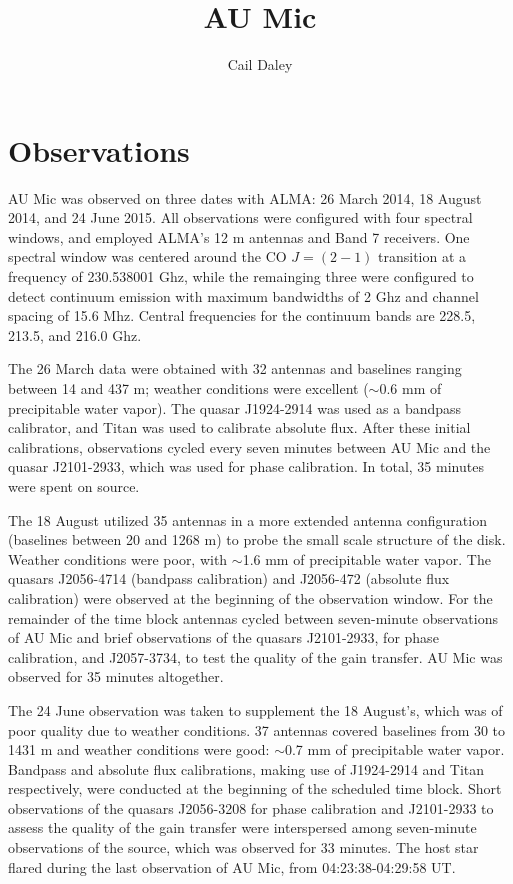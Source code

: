 \documentclass[11pt,modern]{aastex6}
\begin{document}
\title{AU Mic}

\author{Cail Daley}


\section{Observations}
AU Mic was observed on three dates with ALMA: 26 March 2014, 18 August 2014, and 24 June 2015. All observations were configured with four spectral windows, and employed ALMA's 12 m antennas and Band 7 receivers. One spectral window was centered around the CO $J = (2-1)$ transition at a frequency of 230.538001 Ghz, while the remainging three were configured to detect continuum emission with maximum bandwidths of 2 Ghz and channel spacing of 15.6 Mhz. Central frequencies for the continuum bands are 228.5, 213.5, and 216.0 Ghz.

The 26 March data were obtained with 32 antennas and baselines ranging between  14 and 437 m; weather conditions were excellent ($\sim$0.6 mm of precipitable water vapor). The quasar J1924-2914 was used as a bandpass calibrator, and Titan was used to calibrate absolute flux. After these initial calibrations, observations cycled every seven minutes between AU Mic and the quasar J2101-2933, which was used for phase calibration. In total, 35 minutes were spent on source.

The 18 August utilized 35 antennas in a more extended antenna configuration (baselines between 20 and 1268 m) to probe the small scale structure of the disk. Weather conditions were poor, with $\sim$1.6 mm of precipitable water vapor. The quasars J2056-4714 (bandpass calibration) and J2056-472 (absolute flux calibration) were observed at the beginning of the observation window. For the remainder of the time block antennas cycled between seven-minute observations of AU Mic and brief observations of the quasars J2101-2933, for phase calibration, and J2057-3734, to test the quality of the gain transfer. AU Mic was observed for 35 minutes altogether.

The 24 June observation was taken to supplement the 18 August's, which was of poor quality due to weather conditions. 37 antennas covered baselines from 30 to 1431 m and weather conditions were good: $\sim$0.7 mm of precipitable water vapor. Bandpass and absolute flux calibrations, making use of J1924-2914 and Titan respectively, were conducted at the beginning of the scheduled time block. Short observations of the quasars J2056-3208 for phase calibration and J2101-2933 to assess the quality of the gain transfer were interspersed among seven-minute observations of the source, which was observed for 33 minutes. The host star flared during the last observation of AU Mic, from 04:23:38-04:29:58 UT.
\end{document}
